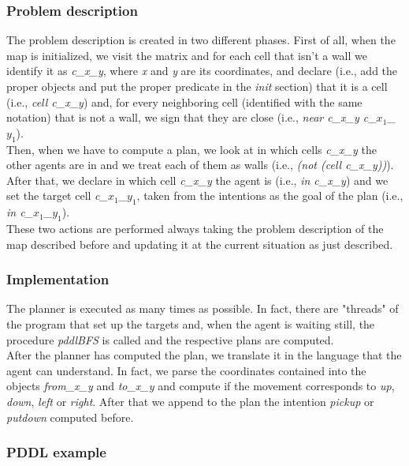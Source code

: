 \documentclass[a4paper, 11pt]{article}
\begin{document}
\subsubsection{Problem description}

The problem description is created in two different phases.
First of all, when the map is initialized, we visit the matrix and for each cell that isn't a wall we identify it as \emph{c\_x\_y}, where \emph{x} and \emph{y} are its coordinates, and declare (i.e., add the proper objects and put the proper predicate in the \emph{init} section) that it is a cell (i.e., \emph{cell c\_x\_y}) and, for every neighboring cell (identified with the same notation) that is not a wall, we sign that they are close (i.e., \emph{near c\_x\_y c\_\(x_1\)\_\(y_1\)}).\\
Then, when we have to compute a plan, we look at in which cells \emph{c\_x\_y} the other agents are in and we treat each of them as walls (i.e., \emph{(not (cell c\_x\_y))}). After that, we declare in which cell \emph{c\_x\_y} the agent is (i.e., \emph{in c\_x\_y}) and we set the target cell \emph{c\_\(x_1\)\_\(y_1\)}, taken from the intentions as the goal of the plan (i.e., \emph{in c\_\(x_1\)\_\(y_1\)}).\\
These two actions are performed always taking the problem description of the map described before and updating it at the current situation as just described.

\subsubsection{Implementation}

The planner is executed as many times as possible. In fact, there are "threads" of the program that set up the targets and, when the agent is waiting still, the procedure \emph{pddlBFS} is called and the respective plans are computed.\\

After the planner has computed the plan, we translate it in the language that the agent can understand. In fact, we parse the coordinates contained into the objects \emph{from\_x\_y} and \emph{to\_x\_y} and compute if the movement corresponds to \emph{up}, \emph{down}, \emph{left} or \emph{right}. After that we append to the plan the intention \emph{pickup} or \emph{putdown} computed before.\\

\subsubsection{PDDL example}
\end{document}

